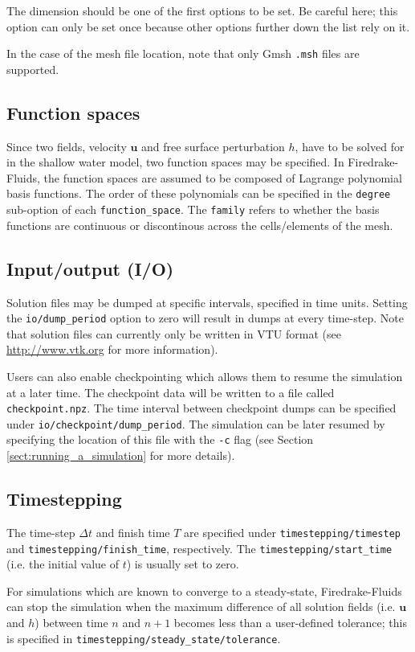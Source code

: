 \documentclass[a4paper,11pt]{report}
\begin{document}
The dimension should be one of the first options to be set. Be careful here; this option can only be set once because other options further down the list rely on it.

In the case of the mesh file location, note that only Gmsh \texttt{.msh} files \citep{GeuzaineRemacle_2009} are supported.

\subsection{Function spaces}
Since two fields, velocity $\mathbf{u}$ and free surface perturbation $h$, have to be solved for in the shallow water model, two function spaces may be specified. In Firedrake-Fluids, the function spaces are assumed to be composed of Lagrange polynomial basis functions. The order of these polynomials can be specified in the \texttt{degree} sub-option of each \texttt{function\_space}. The \texttt{family} refers to whether the basis functions are continuous or discontinous across the cells/elements of the mesh.

\subsection{Input/output (I/O)}
Solution files may be dumped at specific intervals, specified in time units. Setting the \texttt{io/dump\_period} option to zero will result in dumps at every time-step. Note that solution files can currently only be written in VTU format (see \url{http://www.vtk.org} for more information).

Users can also enable checkpointing which allows them to resume the simulation at a later time. The checkpoint data will be written to a file called \texttt{checkpoint.npz}. The time interval between checkpoint dumps can be specified under \texttt{io/checkpoint/dump\_period}. The simulation can be later resumed by specifying the location of this file with the \texttt{-c} flag (see Section \ref{sect:running_a_simulation} for more details).

\subsection{Timestepping}
The time-step $\Delta t$ and finish time $T$ are specified under \texttt{timestepping/timestep} and \texttt{timestepping/finish\_time}, respectively. The \texttt{timestepping/start\_time} (i.e. the initial value of $t$) is usually set to zero.

For simulations which are known to converge to a steady-state, Firedrake-Fluids can stop the simulation when the maximum difference of all solution fields (i.e. $\mathbf{u}$ and $h$) between time $n$ and $n+1$ becomes less than a user-defined tolerance; this is specified in \texttt{timestepping/steady\_state/tolerance}.
\end{document}

